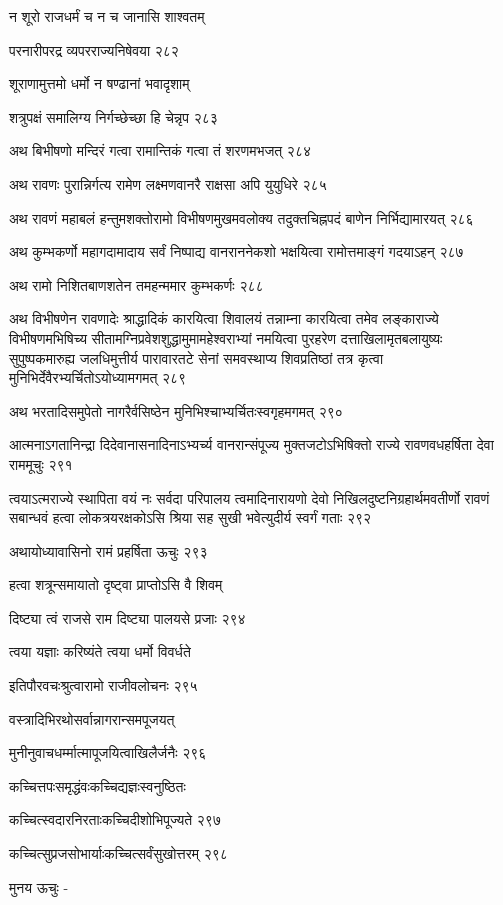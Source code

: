 न शूरो राजधर्मं च न च जानासि शाश्वतम्

परनारीपरद्र व्यपरराज्यनिषेवया २८२

शूराणामुत्तमो धर्मो न षण्ढानां भवादृशाम्

शत्रुपक्षं समालिग्य निर्गच्छेच्छा हि चेन्नृप २८३

अथ बिभीषणो मन्दिरं गत्वा रामान्तिकं गत्वा तं शरणमभजत् २८४

अथ रावणः पुरान्निर्गत्य रामेण लक्ष्मणवानरै राक्षसा अपि युयुधिरे २८५

अथ रावणं महाबलं हन्तुमशक्तोरामो विभीषणमुखमवलोक्य तदुक्तचिह्नपदं बाणेन निर्भिद्यामारयत्
२८६

अथ कुम्भकर्णो महागदामादाय सर्वं निष्पाद्य वानराननेकशो भक्षयित्वा रामोत्तमाङ्गं
गदयाऽहन् २८७

अथ रामो निशितबाणशतेन तमहन्ममार कुम्भकर्णः २८८

अथ विभीषणेन रावणादेः श्राद्धादिकं कारयित्वा शिवालयं तन्नाम्ना कारयित्वा तमेव
लङ्काराज्ये विभीषणमभिषिच्य सीतामग्निप्रवेशशुद्धामुमामहेश्वराभ्यां नमयित्वा पुरहरेण
दत्ताखिलामृतबलायुष्यः सुपुष्पकमारुह्य जलधिमुत्तीर्य पारावारतटे सेनां समवस्थाप्य
शिवप्रतिष्ठां तत्र कृत्वा मुनिभिर्देवैरभ्यर्चितोऽयोध्यामगमत् २८९

अथ भरतादिसमुपेतो नागरैर्वसिष्ठेन मुनिभिश्चाभ्यर्चितःस्वगृहमगमत् २९०

आत्मनाऽगतानिन्द्रा दिदेवानासनादिनाऽभ्यर्च्य वानरान्संपूज्य मुक्तजटोऽभिषिक्तो राज्ये
रावणवधहर्षिता देवा राममूचुः २९१

त्वयाऽत्मराज्ये स्थापिता वयं नः सर्वदा परिपालय त्वमादिनारायणो देवो
निखिलदुष्टनिग्रहार्थमवतीर्णो रावणं सबान्धवं हत्वा लोकत्रयरक्षकोऽसि श्रिया सह सुखी
भवेत्युदीर्य स्वर्गं गताः २९२

अथायोध्यावासिनो रामं प्रहर्षिता ऊचुः २९३

हत्वा शत्रून्समायातो दृष्ट्वा प्राप्तोऽसि वै शिवम्

दिष्ट्या त्वं राजसे राम दिष्ट्या पालयसे प्रजाः २९४

त्वया यज्ञाः करिष्यंते त्वया धर्मो विवर्धते

इतिपौरवचःश्रुत्वारामो राजीवलोचनः २९५

वस्त्रादिभिरथोसर्वान्नागरान्समपूजयत्

मुनीनुवाचधर्म्मात्मापूजयित्वाखिलैर्जनैः २९६

कच्चित्तपःसमृद्धंवःकच्चिद्यज्ञःस्वनुष्ठितः

कच्चित्स्वदारनिरताःकच्चिदीशोभिपूज्यते २९७

कच्चित्सुप्रजसोभार्याःकच्चित्सर्वंसुखोत्तरम् २९८

मुनय ऊचुः -


